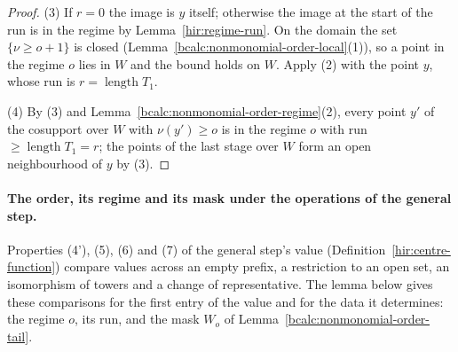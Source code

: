 \begin{proof}
(3) If \(r=0\) the image is \(y\) itself; otherwise the image at the start of the run is in the regime by Lemma~\ref{hir:regime-run}. On the domain the set
\(\{\nu\ge o+1\}\) is closed (Lemma~\ref{bcalc:nonmonomial-order-local}(1)), so a point in the regime \(o\) lies in \(W\) and the bound holds on \(W\). Apply (2)
with the point \(y\), whose run is \(r=\operatorname{length}T_1\).

(4) By (3) and Lemma~\ref{bcalc:nonmonomial-order-regime}(2), every point \(y'\) of the cosupport over \(W\) with \(\nu(y')\ge o\) is in the regime \(o\) with run
\(\ge\operatorname{length}T_1=r\); the points of the last stage over \(W\) form an open neighbourhood of \(y\) by (3).
\end{proof}

\paragraph{The order, its regime and its mask under the operations of the general step.} Properties (4'), (5), (6) and (7) of the general
step's value (Definition~\ref{hir:centre-function}) compare values across an empty prefix, a restriction to an open set, an isomorphism of towers and a
change of representative. The lemma below gives these comparisons for the first entry of the value and for the data it determines: the regime \(o\), its
run, and the mask \(W_o\) of Lemma~\ref{bcalc:nonmonomial-order-tail}.

